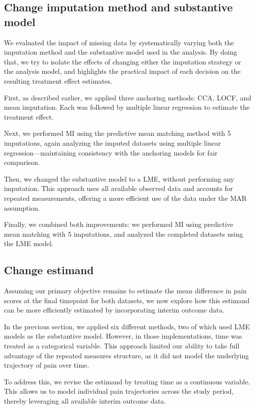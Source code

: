 \documentclass{article}
\begin{document}
\subsection{Change imputation method and substantive
model}\label{change-imputation-method-and-substantive-model}

We evaluated the impact of missing data by systematically varying both
the imputation method and the substantive model used in the analysis. By
doing that, we try to isolate the effects of changing either the
imputation strategy or the analysis model, and highlights the practical
impact of each decision on the resulting treatment effect estimates.

First, as described earlier, we applied three anchoring methods: CCA,
LOCF, and mean imputation. Each was followed by multiple linear
regression to estimate the treatment effect.

Next, we performed MI using the predictive mean matching method with 5
imputations, again analyzing the imputed datasets using multiple linear
regression---maintaining consistency with the anchoring models for fair
comparison.

Then, we changed the substantive model to a LME, without performing any
imputation. This approach uses all available observed data and accounts
for repeated measurements, offering a more efficient use of the data
under the MAR assumption.

Finally, we combined both improvements: we performed MI using predictive
mean matching with 5 imputations, and analyzed the completed datasets
using the LME model.

\subsection{Change estimand}\label{change-estimand}

Assuming our primary objective remains to estimate the mean difference
in pain scores at the final timepoint for both datasets, we now explore
how this estimand can be more efficiently estimated by incorporating
interim outcome data.

In the previous section, we applied six different methods, two of which
used LME models as the substantive model. However, in those
implementations, time was treated as a categorical variable. This
approach limited our ability to take full advantage of the repeated
measures structure, as it did not model the underlying trajectory of
pain over time.

To address this, we revise the estimand by treating time as a continuous
variable. This allows us to model individual pain trajectories across
the study period, thereby leveraging all available interim outcome data.
\end{document}
